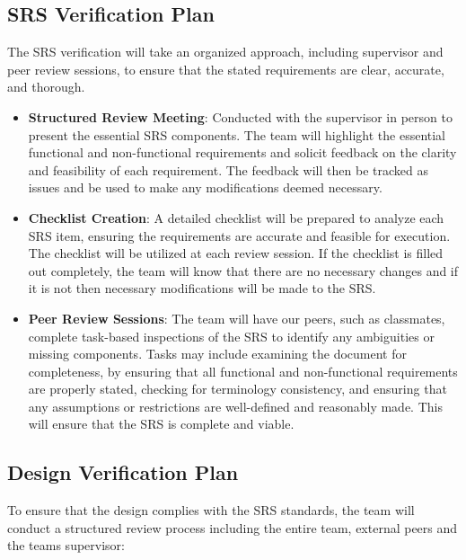 \documentclass[12pt, titlepage]{article}
\begin{document}
\subsection{SRS Verification Plan}

\noindent The SRS verification will take an organized approach, including supervisor and peer review sessions, to ensure that the stated requirements are clear, accurate, and thorough. 

\begin{itemize}
    \item \textbf{Structured Review Meeting}: Conducted with the supervisor in person to present the essential SRS components. The team will highlight the essential functional and non-functional requirements and solicit feedback on the clarity and feasibility of each requirement. The feedback will then be tracked as issues and be used to make any modifications deemed necessary.
    \item \textbf{Checklist Creation}: A detailed checklist will be prepared to analyze each SRS item, ensuring the requirements are accurate and feasible for execution. The checklist will be utilized at each review session. If the checklist is filled out completely, the team will know that there are no necessary changes and if it is not then necessary modifications will be made to the SRS.
    \item \textbf{Peer Review Sessions}: The team will have our peers, such as classmates, complete task-based inspections of the SRS to identify any ambiguities or missing components. Tasks may include examining the document for completeness, by ensuring that all functional and non-functional requirements are properly stated, checking for terminology consistency, and ensuring that any assumptions or restrictions are well-defined and reasonably made. This will ensure that the SRS is complete and viable. 
\end{itemize}

\subsection{Design Verification Plan}

\noindent To ensure that the design complies with the SRS standards, the team will conduct a structured review process including the entire team, external peers and the teams supervisor:
\end{document}
